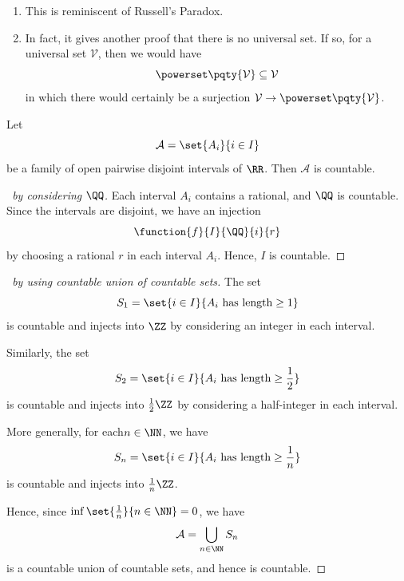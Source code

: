 \begin{remarks}
    \begin{enumerate}
        \item This is reminiscent of Russell's Paradox.
        \item In fact, it gives another proof that there is no universal set. If so, for a universal set \(\mathcal{V}\), then we would have
        \[
            \powerset\pqty{\mathcal{V}} \subseteq \mathcal{V}
        \]
        in which there would certainly be a surjection \(\mathcal{V} \to \powerset\pqty{\mathcal{V}}\).
    \end{enumerate}
\end{remarks}

\begin{proposition}
    Let
    \[
        \mathcal{A} = \set{A_i}{i \in I}
    \]
    be a family of open pairwise disjoint intervals of \(\RR\). Then \(\mathcal{A}\) is countable.
\end{proposition}

\begin{proof}[\proofname\ by considering \(\QQ\)]
    Each interval \(A_i\) contains a rational, and \(\QQ\) is countable. Since the intervals are disjoint, we have an injection
    \[
        \function{f}{I}{\QQ}{i}{r}
    \]
    by choosing a rational \(r\) in each interval \(A_i\). Hence, \(I\) is countable.
\end{proof}

\begin{proof}[\proofname\ by using countable union of countable sets]
    The set
    \[
        S_1 = \set{i \in I}{A_i \text{ has length} \geq 1}
    \]
    is countable and injects into \(\ZZ\) by considering an integer in each interval.

    Similarly, the set
    \[
        S_2 = \set{i \in I}{A_i \text{ has length} \geq \frac{1}{2}}
    \]
    is countable and injects into \(\frac{1}{2} \ZZ\) by considering a half-integer in each interval.

    More generally, for each\(n \in \NN\), we have
    \[
        S_n = \set{i \in I}{A_i \text{ has length} \geq \frac{1}{n}}
    \]
    is countable and injects into \(\frac{1}{n} \ZZ\).

    Hence, since \(\inf \set{\frac{1}{n}}{n \in \NN} = 0\), we have
    \[
        \mathcal{A} = \bigcup_{n \in \NN} S_n
    \]
    is a countable union of countable sets, and hence is countable.
\end{proof}

